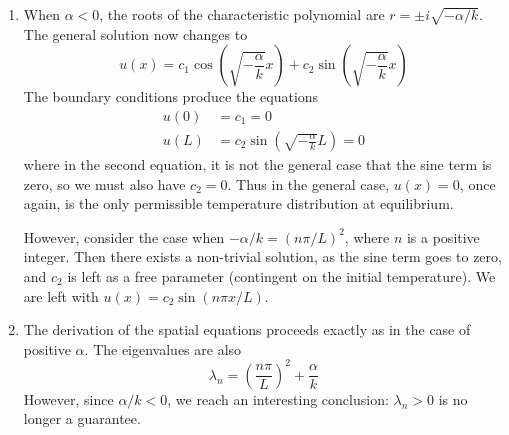 \documentclass[a4paper]{article}
\begin{document}
\begin{enumerate}[label=(\alph*)]
	\item When \( \alpha < 0 \), the roots of the characteristic polynomial are \( r = \pm i\sqrt{-\alpha / k} \). The general solution now changes to
	\[
		u \!\left( x \right) = c_{1}\cos\!\left(\sqrt{-\frac{\alpha}{k}}x\right) + c_{2}\sin\!\left(\sqrt{-\frac{\alpha}{k}}x\right)
	\]
	The boundary conditions produce the equations
	\begin{align*}
		u \!\left( 0 \right) & = c_{1} = 0 \\
		u \!\left( L \right) & = c_{2}\sin\!\left(\sqrt{-\frac{\alpha}{k}}L\right) = 0
	\end{align*}
	where in the second equation, it is not the general case that the sine term is zero, so we must also have \( c_{2} = 0 \). Thus in the general case, \( u \!\left( x \right) = 0 \), once again, is the only permissible temperature distribution at equilibrium.

	However, consider the case when \( -\alpha / k = \!\left( n \pi / L \right)^{2} \), where \( n \) is a positive integer. Then there exists a non-trivial solution, as the sine term goes to zero, and \( c_{2} \) is left as a free parameter (contingent on the initial temperature). We are left with \( u \!\left( x \right) = c_{2}\sin\!\left(n \pi x / L\right) \).
	\item The derivation of the spatial equations proceeds exactly as in the case of positive \( \alpha \). The eigenvalues are also
	\[
		\lambda_{n} = \!\left( \frac{n \pi}{L} \right)^{2} + \frac{\alpha}{k} 
	\]
	However, since \( \alpha / k < 0 \), we reach an interesting conclusion: \( \lambda_{n} > 0 \) is no longer a guarantee.


\end{enumerate}
\end{document}
